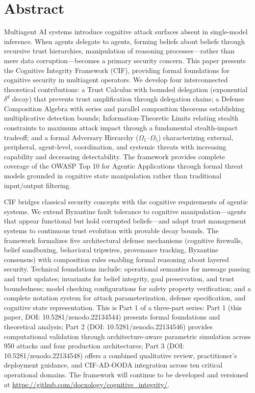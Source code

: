 \documentclass[
]{article}
\begin{document}
\newpage
\tableofcontents
\newpage

\newpage

\section{Abstract}\label{abstract}

Multiagent AI systems introduce cognitive attack surfaces absent in
single-model inference. When agents delegate to agents, forming beliefs
about beliefs through recursive trust hierarchies, manipulation of
reasoning processes---rather than mere data corruption---becomes a
primary security concern. This paper presents the Cognitive Integrity
Framework (CIF), providing formal foundations for cognitive security in
multiagent operators. We develop four interconnected theoretical
contributions: a Trust Calculus with bounded delegation (exponential
\(\delta^d\) decay) that prevents trust amplification through delegation
chains; a Defense Composition Algebra with series and parallel
composition theorems establishing multiplicative detection bounds;
Information-Theoretic Limits relating stealth constraints to maximum
attack impact through a fundamental stealth-impact tradeoff; and a
formal Adversary Hierarchy (\(\Omega_1\)--\(\Omega_5\)) characterizing
external, peripheral, agent-level, coordination, and systemic threats
with increasing capability and decreasing detectability. The framework
provides complete coverage of the OWASP Top 10 for Agentic Applications
through formal threat models grounded in cognitive state manipulation
rather than traditional input/output filtering.

CIF bridges classical security concepts with the cognitive requirements
of agentic systems. We extend Byzantine fault tolerance to cognitive
manipulation---agents that appear functional but hold corrupted
beliefs---and adapt trust management systems to continuous trust
evolution with provable decay bounds. The framework formalizes five
architectural defense mechanisms (cognitive firewalls, belief
sandboxing, behavioral tripwires, provenance tracking, Byzantine
consensus) with composition rules enabling formal reasoning about
layered security. Technical foundations include: operational semantics
for message passing and trust updates; invariants for belief integrity,
goal preservation, and trust boundedness; model checking configurations
for safety property verification; and a complete notation system for
attack parameterization, defense specification, and cognitive state
representation. This is Part 1 of a three-part series: Part 1 (this
paper, DOI: 10.5281/zenodo.22134544) presents formal foundations and
theoretical analysis; Part 2 (DOI: 10.5281/zenodo.22134546) provides
computational validation through architecture-aware parametric
simulation across 950 attacks and four production architectures; Part 3
(DOI: 10.5281/zenodo.22134548) offers a combined qualitative review,
practitioner's deployment guidance, and CIF-AD-OODA integration across
ten critical operational domains. The framework will continue to be
developed and versioned at
\url{https://github.com/docxology/cognitive_integrity/}.
\end{document}
